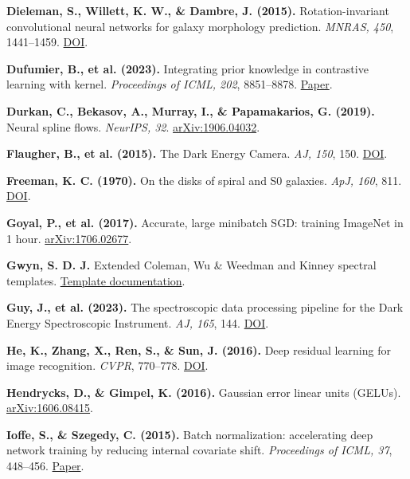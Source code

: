 \documentclass[11pt]{article}
\begin{document}
\hypertarget{ref:dieleman2015}{}%
\textbf{Dieleman, S., Willett, K. W., \& Dambre, J. (2015).} Rotation-invariant convolutional neural networks for galaxy morphology prediction. \emph{MNRAS, 450}, 1441--1459. \href{https://doi.org/10.1093/mnras/stv632}{DOI}.\par
\hypertarget{ref:dufumier2023}{}%
\textbf{Dufumier, B., et al. (2023).} Integrating prior knowledge in contrastive learning with kernel. \emph{Proceedings of ICML, 202}, 8851--8878. \href{https://proceedings.mlr.press/v202/dufumier23a.html}{Paper}.\par
\hypertarget{ref:durkan2019}{}%
\textbf{Durkan, C., Bekasov, A., Murray, I., \& Papamakarios, G. (2019).} Neural spline flows. \emph{NeurIPS, 32}. \href{https://arxiv.org/abs/1906.04032}{arXiv:1906.04032}.\par
\hypertarget{ref:flaugher2015}{}%
\textbf{Flaugher, B., et al. (2015).} The Dark Energy Camera. \emph{AJ, 150}, 150. \href{https://doi.org/10.1088/0004-6256/150/5/150}{DOI}.\par
\hypertarget{ref:freeman1970}{}%
\textbf{Freeman, K. C. (1970).} On the disks of spiral and S0 galaxies. \emph{ApJ, 160}, 811. \href{https://doi.org/10.1086/150474}{DOI}.\par
\hypertarget{ref:goyal2017}{}%
\textbf{Goyal, P., et al. (2017).} Accurate, large minibatch SGD: training ImageNet in 1 hour. \href{https://arxiv.org/abs/1706.02677}{arXiv:1706.02677}.\par
\hypertarget{ref:gwyn}{}%
\textbf{Gwyn, S. D. J.} Extended Coleman, Wu \& Weedman and Kinney spectral templates. \href{https://www.astro.uvic.ca/~gwyn/pz/specc/index.html}{Template documentation}.\par
\hypertarget{ref:guy2023}{}%
\textbf{Guy, J., et al. (2023).} The spectroscopic data processing pipeline for the Dark Energy Spectroscopic Instrument. \emph{AJ, 165}, 144. \href{https://doi.org/10.3847/1538-3881/acb212}{DOI}.\par
\hypertarget{ref:he2016}{}%
\textbf{He, K., Zhang, X., Ren, S., \& Sun, J. (2016).} Deep residual learning for image recognition. \emph{CVPR}, 770--778. \href{https://doi.org/10.1109/CVPR.2016.90}{DOI}.\par
\hypertarget{ref:hendrycks2016}{}%
\textbf{Hendrycks, D., \& Gimpel, K. (2016).} Gaussian error linear units (GELUs). \href{https://arxiv.org/abs/1606.08415}{arXiv:1606.08415}.\par
\hypertarget{ref:ioffe2015}{}%
\textbf{Ioffe, S., \& Szegedy, C. (2015).} Batch normalization: accelerating deep network training by reducing internal covariate shift. \emph{Proceedings of ICML, 37}, 448--456. \href{https://proceedings.mlr.press/v37/ioffe15.html}{Paper}.\par
\end{document}
